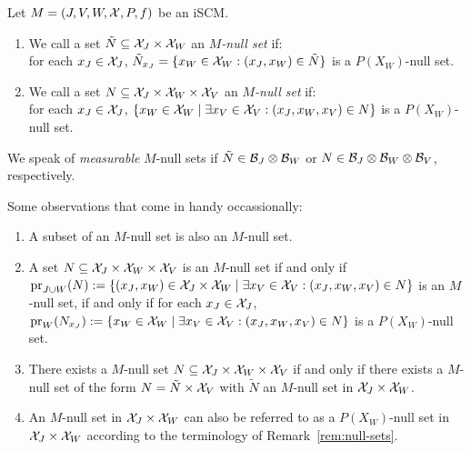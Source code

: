 \begin{Def}
  Let $M = \left ( J, V, W, \mathcal{X}, P, f \right )$ be an iSCM.
  \begin{enumerate}
    \item We call a set $\tilde{N} \subseteq \mathcal{X}_J \times \mathcal{X}_W$ an \emph{$M$-null set} if:\\
      for each $x_J \in \mathcal{X}_J$, $\tilde{N}_{x_J} = \{x_W \in \mathcal{X}_W : (x_J,x_W) \in \tilde{N}\}$ is a $P(X_W)$-null set.
    \item We call a set $N \subseteq \mathcal{X}_J \times \mathcal{X}_W \times \mathcal{X}_V$ an \emph{$M$-null set} if:\\
      for each $x_J \in \mathcal{X}_J$, $\{x_W \in \mathcal{X}_W \mid \exists x_V \in \mathcal{X}_V : (x_J,x_W,x_V) \in N\}$ is a $P(X_W)$-null set.
  \end{enumerate}
  We speak of \emph{measurable} $M$-null sets if $\tilde{N} \in \mathcal{B}_J \otimes \mathcal{B}_W$ or $N \in \mathcal{B}_J \otimes \mathcal{B}_W \otimes \mathcal{B}_V$, respectively.
\end{Def}
Some observations that come in handy occassionally:
\begin{Rem}
  \begin{enumerate}
    \item A subset of an $M$-null set is also an $M$-null set.
    \item A set $N \subseteq \mathcal{X}_J \times \mathcal{X}_W \times \mathcal{X}_V$ is an $M$-null set if and only if $\mathrm{pr}_{J\cup W}(N) := \{(x_J,x_W) \in \mathcal{X}_J \times \mathcal{X}_W \mid \exists x_V \in \mathcal{X}_V : (x_J,x_W,x_V) \in N\}$ is an $M$-null set, if and only if for each $x_J \in \mathcal{X}_J$, $\mathrm{pr}_W(N_{x_J}) := \{x_W \in \mathcal{X}_W \mid \exists x_V \in \mathcal{X}_V : (x_J,x_W,x_V) \in N\}$ is a $P(X_W)$-null set.
    \item There exists a $M$-null set $N \subseteq \mathcal{X}_J \times \mathcal{X}_W \times \mathcal{X}_V$ if and only if there exists a $M$-null set of the form $N = \tilde{N} \times \mathcal{X}_V$ with $\tilde{N}$ an $M$-null set in $\mathcal{X}_J \times \mathcal{X}_W$.
    \item An $M$-null set in $\mathcal{X}_J \times \mathcal{X}_W$ can also be referred to as a $P(X_W)$-null set in $\mathcal{X}_J \times \mathcal{X}_W$ according to the terminology of Remark~\ref{rem:null-sets}.
  \end{enumerate}
\end{Rem}
